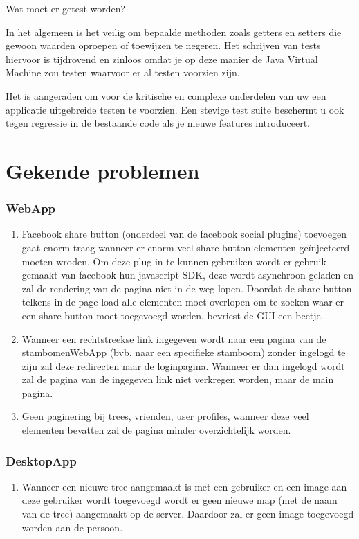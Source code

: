 \documentclass[pdftex,a4paper,12pt,twoside]{report}
\begin{document}
Wat moet er getest worden?

In het algemeen is het veilig om bepaalde methoden zoals getters en setters die gewoon waarden oproepen of toewijzen te negeren. Het schrijven van tests hiervoor is tijdrovend en zinloos omdat je op deze manier de Java Virtual Machine zou testen waarvoor er al testen voorzien zijn.

Het is aangeraden om voor de kritische en complexe onderdelen van uw een applicatie uitgebreide testen te voorzien. Een stevige test suite beschermt u ook tegen regressie in de bestaande code als je nieuwe features introduceert.




\chapter{Gekende problemen}
\subsection{WebApp}
\begin{enumerate}
\item \label{it:first}Facebook share button (onderdeel van de facebook social plugins) toevoegen gaat enorm traag wanneer er enorm veel share button elementen geïnjecteerd moeten wroden.
Om deze plug-in te kunnen gebruiken wordt er gebruik gemaakt van facebook hun javascript SDK, deze wordt asynchroon geladen en zal de rendering van de pagina niet in de weg lopen.
Doordat de share button telkens in de page load alle elementen moet overlopen om te zoeken waar er een share button moet toegevoegd worden, bevriest de GUI een beetje.

\item \label{it:first}Wanneer een rechtstreekse link ingegeven wordt naar een pagina van de stambomenWebApp (bvb. naar een specifieke stamboom) zonder ingelogd te zijn zal deze redirecten naar de loginpagina. Wanneer er dan ingelogd wordt zal de pagina van de ingegeven link niet verkregen worden, maar de main pagina.

\item \label{it:first}Geen paginering bij trees, vrienden, user profiles, wanneer deze veel elementen bevatten zal de pagina minder overzichtelijk worden.
\end{enumerate}

\subsection{DesktopApp}
\begin{enumerate}
\item \label{it:first}Wanneer een nieuwe tree aangemaakt is met een gebruiker en een image aan deze gebruiker wordt toegevoegd wordt er geen nieuwe map (met de naam van de tree) aangemaakt op de server. Daardoor zal er geen image toegevoegd worden aan de persoon.
\end{enumerate}
\end{document}
